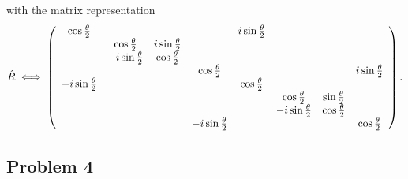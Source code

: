 \documentclass{../mathnotes}
\begin{document}
with the matrix representation
\begin{align*}
    \hat R \iff
    \left(
    \begin{array}[]{cccccccc}
        \cos\frac{\theta}{2} &  &  &  &i\sin\frac{\theta}{2}  &  &  & \\
        &\cos\frac{\theta}{2} &i\sin\frac{\theta}{2}  &  &  &  &  & \\
        & -i\sin\frac{\theta}{2} & \cos\frac{\theta}{2} &  &  &  &  & \\
        &  &  & \cos\frac{\theta}{2} &  &  &  & i\sin\frac{\theta}{2}\\
        -i\sin\frac{\theta}{2}&  &  &  & \cos\frac{\theta}{2} &  &  & \\
        &  &  &  &  & \cos\frac{\theta}{2} &\sin\frac{\theta}{2}  & \\
        &  &  &  &  & -i\sin\frac{\theta}{2} & \cos\frac{\theta}{2} & \\
        &  &  & -i\sin\frac{\theta}{2} &  &  &  & \cos\frac{\theta}{2}\\
    \end{array}
    \right).
\end{align*}

\subsection*{Problem 4}
\end{document}
